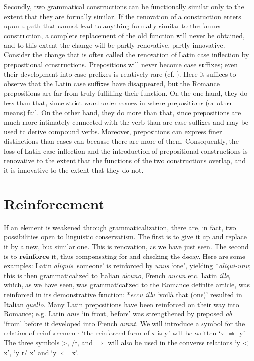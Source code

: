 Secondly, two grammatical constructions can be functionally similar only to the extent that they are formally similar. If the renovation of a construction enters upon a path that cannot lead to anything formally similar to the former construction, a complete replacement of the old function will never be obtained, and to this extent the change will be partly renovative, partly innovative. Consider the change that is often called the renovation of Latin case inflection by prepositional constructions. Prepositions will never become case suffixes; even their development into case prefixes is relatively rare (cf. ). Here it suffices to observe that the Latin case suffixes have disappeared, but the Romance prepositions are far from truly fulfilling their function. On the one hand, they do less than that, since strict word order comes in where prepositions (or other means) fail. On the other hand, they do more than that, since prepositions are much more intimately connected with the verb than are case suffixes and may be used to derive compound verbs. Moreover, prepositions can express finer distinctions than cases can because there are more of them. Consequently, the loss of Latin case inflection and the introduction of prepositional constructions is renovative to the extent that the functions of the two constructions overlap, and it is innovative to the extent that they do not.

\section{Reinforcement} \label{sec:2.5}

If an element is weakened through grammaticalization, there are, in fact, two possibilities open to linguistic conservatism. The first is to give it up and replace it by a new, but similar one. This is renovation, as we have just seen. The second is to \textbf{reinforce} it, thus compensating for and checking the decay. Here are some examples: Latin \textit{aliquis} ‘someone’ is reinforced by \textit{unus} ‘one’, yielding *\textit{aliqui-unu}; this is then grammaticalized to Italian \textit{alcuno}, French \textit{aucun} etc. Latin \textit{ille}, which, as we have seen, was grammaticalized to the Romance definite article, was reinforced in its demonstrative function: *\textit{eccu illu} ‘voilà that (one)’ resulted in Italian \textit{quello}. Many Latin prepositions have been reinforced on their way into Romance; e.g. Latin \textit{ante} ‘in front, before’ was strengthened by preposed \textit{ab} ‘from’ before it developed into French \textit{avant}. We will introduce a symbol for the relation of reinforcement: ‘the reinforced form of x is y’ will be written ‘x $\Rightarrow $ y’. The three symbols {\textgreater}, /r, and $\Rightarrow $ will also be used in the converse relations ‘y {\textless} x’, ‘y r/ x’ and ‘y $\Leftarrow $ x’.

